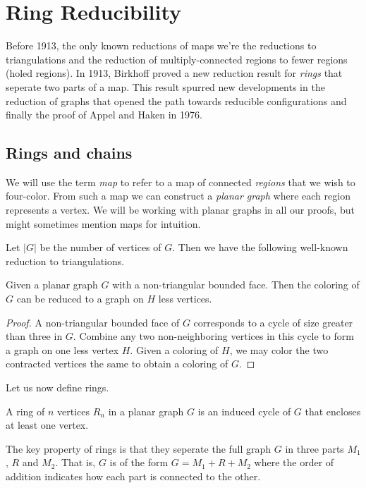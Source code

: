 \section{Ring Reducibility}
\label{sec:birkhoff}

Before 1913, the only known reductions of maps we're the reductions to triangulations and the reduction of multiply-connected regions to fewer regions (holed regions). In 1913, Birkhoff \cite{birkhoff} proved a new reduction result for \textit{rings} that seperate two parts of a map. This result spurred new developments in the reduction of graphs that opened the path towards reducible configurations and finally the proof of Appel and Haken in 1976.

\subsection{Rings and chains}

We will use the term \textit{map} to refer to a map of connected \textit{regions} that we wish to four-color. From such a map we can construct a \textit{planar graph} where each region represents a vertex. We will be working with planar graphs in all our proofs, but might sometimes mention maps for intuition.

Let $|G|$ be the number of vertices of $G$. Then we have the following well-known reduction to triangulations.

\begin{theorem}
\label{thm:triang}
    Given a planar graph $G$ with a non-triangular bounded face. Then the coloring of $G$ can be reduced to a graph on $H$ less vertices.
\end{theorem}
\begin{proof}
    A non-triangular bounded face of $G$ corresponds to a cycle of size greater than three in $G$. Combine any two non-neighboring vertices in this cycle to form a graph on one less vertex $H$. Given a coloring of $H$, we may color the two contracted vertices the same to obtain a coloring of $G$.
\end{proof}

Let us now define rings.

\begin{definition}
    A ring of $n$ vertices $R_n$ in a planar graph $G$ is an induced cycle of $G$ that encloses at least one vertex.
\end{definition}

The key property of rings is that they seperate the full graph $G$ in three parts $M_1$, $R$ and $M_2$. That is, $G$ is of the form $G = M_1 + R + M_2$ where the order of addition indicates how each part is connected to the other.


